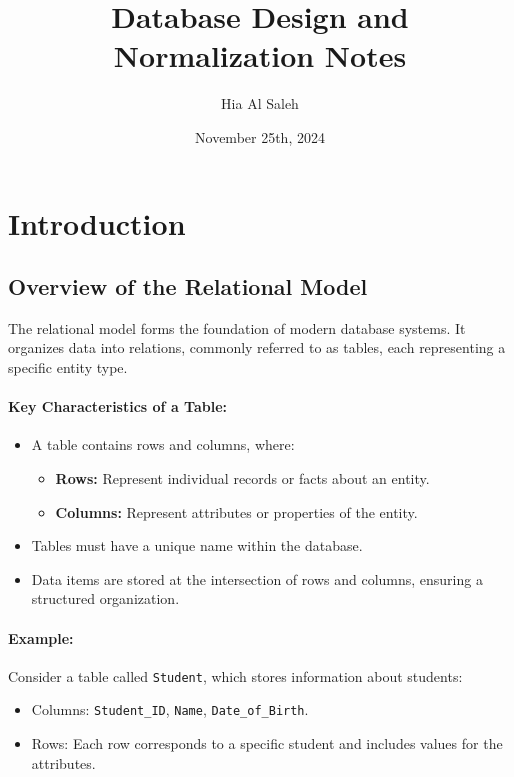 \documentclass{article}
\begin{document}
\title{Database Design and Normalization Notes}
\author{Hia Al Saleh}
\date{November 25th, 2024}
\maketitle
\tableofcontents
\newpage

\section{Introduction}
\subsection{Overview of the Relational Model}
The relational model forms the foundation of modern database systems. It organizes data into relations, commonly referred to as tables, each representing a specific entity type. 

\paragraph{Key Characteristics of a Table:}
\begin{itemize}
    \item A table contains rows and columns, where:
    \begin{itemize}
        \item \textbf{Rows:} Represent individual records or facts about an entity.
        \item \textbf{Columns:} Represent attributes or properties of the entity.
    \end{itemize}
    \item Tables must have a unique name within the database.
    \item Data items are stored at the intersection of rows and columns, ensuring a structured organization.
\end{itemize}

\paragraph{Example:} Consider a table called \texttt{Student}, which stores information about students:
\begin{itemize}
    \item Columns: \texttt{Student\_ID}, \texttt{Name}, \texttt{Date\_of\_Birth}.
    \item Rows: Each row corresponds to a specific student and includes values for the attributes.
\end{itemize}
\end{document}
